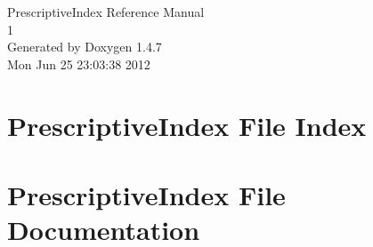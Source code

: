 \documentclass[a4paper]{book}
\begin{document}
\begin{titlepage}
\vspace*{7cm}
\begin{center}
{\Large Prescriptive\-Index Reference Manual\\[1ex]\large 1 }\\
\vspace*{1cm}
{\large Generated by Doxygen 1.4.7}\\
\vspace*{0.5cm}
{\small Mon Jun 25 23:03:38 2012}\\
\end{center}
\end{titlepage}
\clearemptydoublepage
{}
\tableofcontents
\clearemptydoublepage
{}
\chapter{Prescriptive\-Index File Index}

\chapter{Prescriptive\-Index File Documentation}

\printindex
\end{document}
